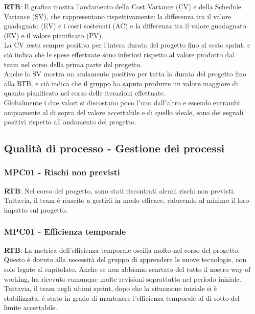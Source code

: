 \documentclass[10pt]{article}
\begin{document}
\begin{justify}
\textbf{RTB}: Il grafico mostra l'andamento  della Cost Variance (CV) e della Schedule Variance (SV), che rappresentano rispettivamente: 
la differenza tra il valore guadagnato (EV) e i costi sostenuti (AC) e la differenza tra il valore guadagnato (EV) e il valore pianificato (PV).\\
La CV resta sempre positiva per l'intera durata del progetto fino al sesto sprint, e ciò indica che le spese effettuate sono inferiori rispetto al valore prodotto
dal team nel corso della prima parte del progetto.\\
Anche la SV mostra un andamento positivo per tutta la durata del progetto fino alla RTB, e ciò indica che il gruppo ha saputo produrre un valore maggiore di quanto
pianificato nel corso delle iterazioni effettuate.\\
Globalmente i due valori si discostano poco l'uno dall'altro e essendo entrambi ampiamente al di sopra del valore accettabile e di quello ideale,  sono dei segnali 
positivi rispetto all'andamento del progetto.


\subsection{Qualità di processo - Gestione dei processi}
\subsubsection{MPC01 - Rischi non previsti}
\textbf{RTB}: Nel corso del progetto, sono stati riscontrati alcuni rischi non previsti. Tuttavia, il team è riuscito a gestirli in modo efficace, riducendo al minimo 
il loro impatto sul progetto.


\subsubsection{MPC01 - Efficienza temporale}
\textbf{RTB}: La metrica dell'efficienza temporale oscilla molto nel corso del progetto. Questo è dovuto alla necessità del gruppo di apprendere le nuove tecnologie, 
non solo legate al capitolato. Anche se non abbiamo scartato del tutto il nostro way of working, ha ricevuto comunque molte revisioni soprattutto nel periodo iniziale. 
Tuttavia, il team negli ultimi sprint, dopo che la situazione iniziale si è stabilizzata, è stato in grado di mantenere l'efficienza temporale al di sotto del limite 
accettabile.



\end{justify}
\end{document}
